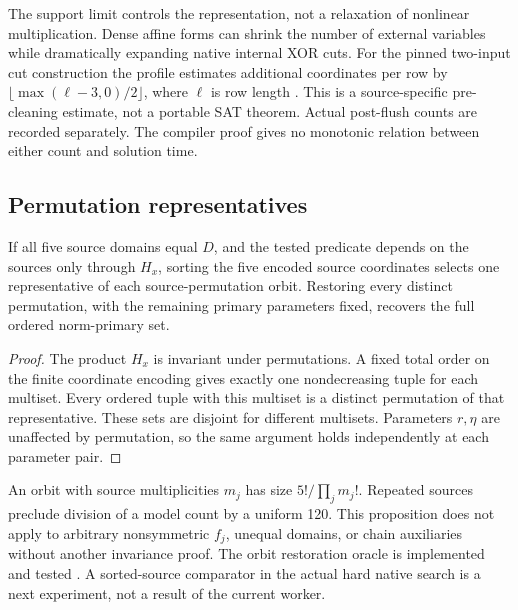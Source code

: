 The support limit controls the representation, not a relaxation of
nonlinear multiplication. Dense affine forms can shrink the number of
external variables while dramatically expanding native internal XOR cuts.
For the pinned two-input cut construction the profile estimates additional
coordinates per row by
$\lfloor\max(\ell-3,0)/2\rfloor$, where $\ell$ is row length .
This is a source-specific pre-cleaning estimate, not a portable SAT theorem.
Actual post-flush counts are recorded separately. The compiler proof gives
no monotonic relation between either count and solution time.

\subsection{Permutation representatives}
\begin{proposition}\label{prop:symmetry}
If all five source domains equal $D$, and the tested predicate depends on
the sources only through $H_x$, sorting the five encoded source coordinates
selects one representative of each source-permutation orbit. Restoring
every distinct permutation, with the remaining primary parameters fixed,
recovers the full ordered norm-primary set.
\end{proposition}
\begin{proof}
The product $H_x$ is invariant under permutations. A fixed total order on
the finite coordinate encoding gives exactly one nondecreasing tuple for
each multiset. Every ordered tuple with this multiset is a distinct
permutation of that representative. These sets are disjoint for different
multisets. Parameters $r,\eta$ are unaffected by permutation, so the same
argument holds independently at each parameter pair.
\end{proof}

An orbit with source multiplicities $m_j$ has size $5!/\prod_jm_j!$.
Repeated sources preclude division of a model count by a uniform 120.
This proposition does not apply to arbitrary nonsymmetric $f_j$, unequal
domains, or chain auxiliaries without another invariance proof.
The orbit restoration oracle is implemented and tested .
A sorted-source comparator in the actual hard native search is a next
experiment, not a result of the current worker.
